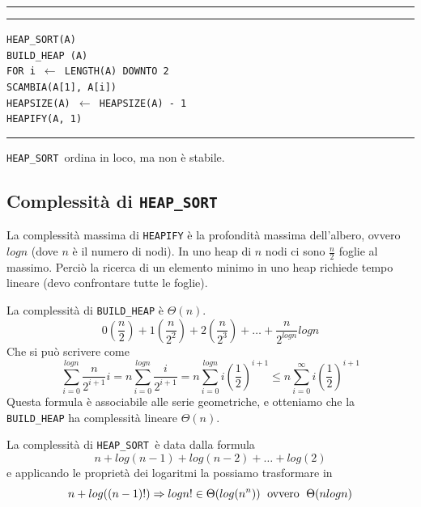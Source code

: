 \documentclass[a4paper,12pt,twoside]{report}
\newcommand\pseudo[1]{\setlength\parindent{0pt}\texttt{#1}\setlength\parindent{24pt} \\}
\newcommand\hlin{\noindent\rule[0.5ex]{\linewidth}{1pt}}
\newcommand\take[2]{#1 $\leftarrow$ #2}
\newcommand\heapsort{\texttt{HEAP\_SORT }}
\begin{document}
\hlin

\hlin

\pseudo{HEAP\_SORT(A)} 
\texttt{\indent BUILD\_HEAP (A) \\
\indent FOR \take{i}{LENGTH(A)} DOWNTO 2 \\
\indent \indent SCAMBIA(A[1], A[i]) \\
\indent\indent \take{HEAPSIZE(A)}{HEAPSIZE(A) - 1} \\
\indent\indent HEAPIFY(A, 1)
}

\hlin

\heapsort ordina in loco, ma non \`{e} stabile.
\newpage
\subsection{Complessit\`{a} di \heapsort}

La complessit\`{a} massima di \texttt{HEAPIFY} \`{e} la profondit\`{a} massima dell'albero, ovvero $log n$ (dove $n$ \`{e} il numero di nodi).
In uno heap di $n$ nodi ci sono $\frac{n}{2}$ foglie al massimo. Perci\`{o} la ricerca di un elemento minimo in uno heap richiede tempo lineare (devo confrontare tutte le foglie).

La complessit\`{a} di \texttt{BUILD\_HEAP} \`{e} $\Theta(n)$.
\[ 0 \left(\frac{n}{2} \right) + 1 \left(\frac{n}{2^2} \right) + 2 \left(\frac{n}{2^3}\right) + \dots + \frac{n}{2^{logn}} log n\]
Che si pu\`{o} scrivere come
\[ \sum_{i=0}^{log n} \frac{n}{2^{i+1}} i = n \sum_{i=0}^{log n} \frac{i}{2^{i+1}} = n \sum_{i=0}^{log n} i\left(\frac{1}{2}\right)^{i+1} \le n \sum_{i=0}^{\infty}i\left(\frac{1}{2}\right)^{i+1}\]
Questa formula \`{e} associabile alle serie geometriche, e otteniamo che la \texttt{BUILD\_HEAP} ha complessit\`{a} lineare $\Theta(n)$.


La complessit\`{a} di \heapsort \`{e} data dalla formula \[n + log(n-1)+log(n-2)+\dots+log(2)\] e applicando le propriet\`{a} dei logaritmi la possiamo trasformare in \[n + log((n-1)!) \Rightarrow log n! \in \Theta(log(n^n)) \thickspace \text{ ovvero } \thickspace \Theta(n log n)\] 
\end{document}
